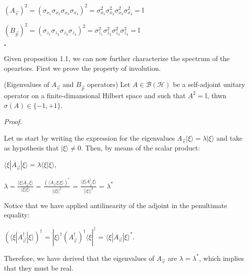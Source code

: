 \documentclass{Configuration_Files/PoliMi3i_thesis}
\begin{document}
\begin{center}
	$(A_{\vec{v}})^{2} = (\sigma_{x_1} \sigma_{x_2} \sigma_{x_3} \sigma_{x_4})^{2} = \sigma_{x_1}^2 \sigma_{x_2}^2 \sigma_{x_3}^2 \sigma_{x_4}^2 = \mathbb{I}$ 
	
	$(B_{\vec{p}})^{2} = (\sigma_{z_1} \sigma_{z_2} \sigma_{z_3} \sigma_{z_4})^{2} = \sigma_{z_1}^2 \sigma_{z_2}^2 \sigma_{z_3}^2 \sigma_{z_4}^2 = \mathbb{I}$
\end{center}

\hfill $\square$

Given proposition 1.1, we can now further characterize the spectrum of the opeartors. First we prove the property of involution.

\begin{proposition} (Eigenvalues of $A_{\vec{v}}$ and $B_{\vec{p}}$ operators) Let $A \in \mathscr{B(\mathscr{H})}$ be a self-adjoint unitary operator on a finite-dimansional Hilbert space and such that $A^2=\mathbb{I}$, thwn $\sigma(A) \in \{-1,+1\}$.
\end{proposition}


\textit{Proof.}\newline

Let us start by writing the expression for the eigenvalues $A_{\vec{v}} |\xi \rangle = \lambda |\xi \rangle$ and take as hypothesis that $|\xi \rangle \neq 0$. Then, by means of the scalar product:

\begin{center}
	$\langle \xi|A_{\vec{v}}|\xi \rangle = \lambda \langle \xi | \xi \rangle$,
	
	$\lambda = \frac {\langle \xi|A_{\vec{v}}\xi \rangle}{\langle \xi |\xi \rangle}$ = $\frac {(\langle A_{\vec{v}}\xi|\xi \rangle)^*}{||\xi||^2}$ = $\frac {\langle \xi|A_{\vec{v}}^{\dagger}\xi \rangle}{||\xi||^2}$ = $\lambda^*$ 
\end{center}

Notice that we have applied antilinearity of the adjoint in the penultimate equality: 

\begin{center}
	$(\langle \xi|A_{\vec{v}}^{\dagger}|\xi \rangle)^{\dagger}$ = $|\xi\rangle^{\dagger} (A_{\vec{v}}^{\dagger})^{\dagger} \langle\xi|^{\dagger}$ = $\langle \xi|A_{\vec{v}}|\xi \rangle^*$.  
\end{center}

Therefore, we have derived that the eigenvalues of $A_{\vec{v}}$ are $\lambda = \lambda^*$, which implies that they must be real.
\end{document}

